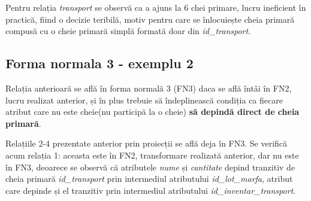 \documentclass[12pt, a4paper]{article}
\begin{document}
\begin{table}[!htbp]
\begin{center}
\caption{Proiectia \emph{R3($K_3$, $Y$)}}\label{tab10-3}
\end{center}
\end{table}

\begin{table}[!htbp]
\begin{center}
\caption{Proiectia \emph{R4($K_4$, $Z$)}}\label{tab10-4}
\end{center}
\end{table}

Pentru relația \emph{transport} se observă ca a ajuns la 6 chei primare, lucru ineficient în practică, fiind o decizie teribilă, motiv pentru care se înlocuiește cheia primară compusă cu o cheie primară simplă formată doar din \emph{id\_transport}.

\subsection*{Forma normala 3 - exemplu 2}
Relația anterioară se află în forma normală 3 (FN3) daca se află întâi în FN2, lucru realizat anterior, și în plus trebuie să îndeplinească condiția ca fiecare atribut care nu este cheie(nu participă la o cheie) \textbf{să depindă direct de cheia primară}.

Relațiile 2-4 prezentate anterior prin proiecții se află deja în FN3. Se verifică acum relația 1: aceasta este în FN2, transformare realizată anterior, dar nu este în FN3, deoarece se observă că atributele \emph{nume} și \emph{cantitate} depind tranzitiv de cheia primară \emph{id\_transport} prin intermediul atributului \emph{id\_lot\_marfa}, atribut care depinde și el tranzitiv prin intermediul atributului \emph{id\_inventar\_transport}.
\end{document}
